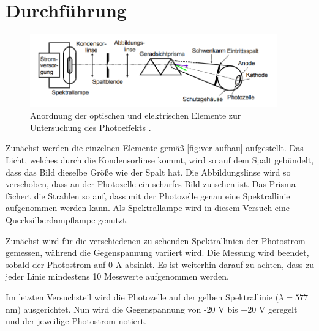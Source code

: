 \section{Durchführung}
\label{sec:Durchführung}

\begin{figure}
  \centering
  \includegraphics[width=0.95\textwidth]{content/ver-aufbau.png}
  \caption{Anordnung der optischen und elektrischen Elemente zur Untersuchung des Photoeffekts \cite{V500}.}
  \label{fig:ver-aufbau}
\end{figure}

Zunächst werden die einzelnen Elemente gemäß \autoref{fig:ver-aufbau} aufgestellt.
Das Licht, welches durch die Kondensorlinse kommt, wird so auf dem Spalt gebündelt, dass das Bild dieselbe Größe wie der Spalt hat.
Die Abbildungslinse wird so verschoben, dass an der Photozelle ein scharfes Bild zu sehen ist.
Das Prisma fächert die Strahlen so auf, dass mit der Photozelle genau eine Spektrallinie aufgenommen werden kann.
Als Spektrallampe wird in diesem Versuch eine Quecksilberdampflampe genutzt.

Zunächst wird für die verschiedenen zu sehenden Spektrallinien der Photostrom gemessen,
während die Gegenspannung variiert wird. Die Messung wird beendet, sobald der Photostrom auf 0 A absinkt.
Es ist weiterhin darauf zu achten, dass zu jeder Linie mindestens 10 Messwerte aufgenommen werden.

Im letzten Versuchsteil wird die Photozelle auf der gelben Spektrallinie ($\lambda = 577$ nm) ausgerichtet.
Nun wird die Gegenspannung von -20 V bis +20 V geregelt und der jeweilige Photostrom notiert.
